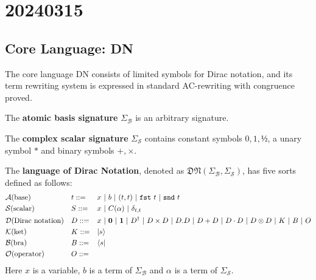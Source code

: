\chapter{20240315}

\newcommand*{\unit}{\texttt{unit}}
\newcommand*{\utt}{\texttt{tt}}
\newcommand*{\fst}{\texttt{fst}}
\newcommand*{\snd}{\texttt{snd}}
\newcommand*{\reduce}{\ \triangleright\ }
\newcommand*{\reducefrom}{\ \triangleleft\ }

\newcommand*{\zeroK}[1]{\mathbf{0}_{\mathcal{K}(#1)}}
\newcommand*{\zeroB}[1]{\mathbf{0}_{\mathcal{B}(#1)}}
\newcommand*{\zeroO}[1]{\mathbf{0}_{\mathcal{O}(#1)}}


\section{Core Language: DN}

The core language DN consists of limited symbols for Dirac notation, and its term rewriting system is expressed in standard AC-rewriting with congruence proved.

\begin{definition} 
  The \textbf{atomic basis signature} $\Sigma_\mathcal{B}$ is an arbitrary signature.
\end{definition}

\begin{definition} 
  The \textbf{complex scalar signature} $\Sigma_\mathcal{S}$ contains constant symbols $0, 1, \text{½}$, a unary symbol $*$ and binary symbols $+, \times$.
\end{definition}

\begin{definition}
  The \textbf{language of Dirac Notation}, denoted as $\mathfrak{DN}(\Sigma_\mathcal{B}, \Sigma_\mathcal{S})$, has five sorts defined as follows:
  \begin{align*}
    & \mathcal{A} \textrm{(base)} && t ::= && x\ |\ b\ |\ (t, t)\ |\ \fst\ t\ |\ \snd\ t \\
    & \mathcal{S} \textrm{(scalar)} && S ::= && x\ |\ C(\alpha)\ |\ \delta_{t, t}\\
    & \mathcal{D} \textrm{(Dirac notation)} && D ::= && x\ |\ \mathbf{0}\ |\ \mathbf{1}\ |\ D^\dagger\ |\ D \times D\ |\ D.D\ |\ D + D\ |\ D \cdot D\ |\ D \otimes D\ |\ K\ |\ B\ |\ O \\
    & \mathcal{K} \textrm{(ket)} && K ::= && \ket{s} \\
    & \mathcal{B} \textrm{(bra)} && B ::= && \bra{s} \\
    & \mathcal{O} \textrm{(operator)} && O ::= && \\
  \end{align*}
  Here $x$ is a variable, $b$ is a term of $\Sigma_\mathcal{B}$ and $\alpha$ is a term of $\Sigma_\mathcal{S}$.

\end{definition}

